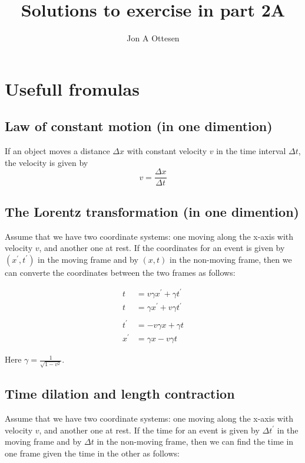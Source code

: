 \documentclass[a4paper,10pt,english]{article}
\begin{document}
\title{Solutions to exercise in part 2A}
\author{Jon A Ottesen}
\maketitle
\clearpage


\section*{Usefull fromulas}
\subsection*{Law of constant motion (in one dimention)}
If an object moves a distance $\Delta x$ with constant velocity $v$ in the time interval $\Delta t$, the velocity is given by 
\begin{equation}\label{eq:const_mot}
v=\frac{\Delta x}{\Delta t}
\end{equation}


\subsection*{The Lorentz transformation (in one dimention)}
Assume that we have two coordinate systems: one moving along the x-axis with velocity $v$, and another one at rest. If the coordinates for an event is given by $(x^{\prime},t^{\prime})$ in the moving frame and by $(x,t)$ in the non-moving frame, then we can converte the coordinates between the two frames as follows:

\begin{align}
t&=v\gamma x^{\prime}+\gamma t^{\prime}\\
t&=\gamma x^{\prime}+v\gamma t^{\prime}\\ \nonumber\\
t^{\prime}&=-v\gamma x+\gamma t\\
x^{\prime}&=\gamma x-v\gamma t
\end{align}

Here $\gamma=\frac{1}{\sqrt{1-v^{2}}}$.


\subsection*{Time dilation and length contraction}
Assume that we have two coordinate systems: one moving along the x-axis with velocity $v$, and another one at rest. If the time for an event is given by $\Delta t^{\prime}$ in the moving frame and by $\Delta t$ in the non-moving frame, then we can find the time in one frame given the time in the other as follows:
\end{document}
